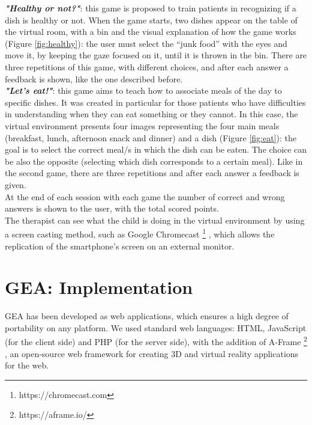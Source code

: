 \documentclass{sigchi-ext}
\begin{document}
\textit{\textbf{"Healthy or not?"}}: this game is proposed to train patients in recognizing if a dish is healthy or not. When the game starts, two dishes appear on the table of the virtual room, with a bin and the visual explanation of how the game works (Figure \ref{fig:healthy}): the user must select the “junk food” with the eyes and move it, by keeping the gaze focused on it, until it is thrown in the bin. There are three repetitions of this game, with different choices, and after each answer a feedback is shown, like the one described before.\\
\medskip
\textit{\textbf{"Let's eat!"}}: this game aims to teach how to associate meals of the day to specific dishes. It was created in particular for those patients who have difficulties in understanding when they can eat something or they cannot. In this case, the virtual environment presents four images representing the four main meals (breakfast, lunch, afternoon snack and dinner) and a dish (Figure \ref{fig:eat}): the goal is to select the correct meal/s in which the dish can be eaten. The choice can be also the opposite (selecting which dish corresponds to a certain meal). Like in the second game, there are three repetitions and after each answer a feedback is given.\\
\medskip
At the end of each session with each game the number of correct and wrong answers is shown to the user, with the total scored points.\\
\medskip
The therapist can see what the child is doing in the virtual environment by using a screen casting method, such as Google Chromecast \footnote{https://chromecast.com} , which allows the replication of the smartphone’s screen on an external monitor.


\section{GEA: Implementation}
GEA has been developed as web applications, which ensures a high degree of portability on any platform. We used standard web languages: HTML, JavaScript (for the client side) and PHP (for the server side), with the addition of A-Frame \footnote{https://aframe.io/} , an open-source web framework for creating 3D and virtual reality applications for the web.
\end{document}
